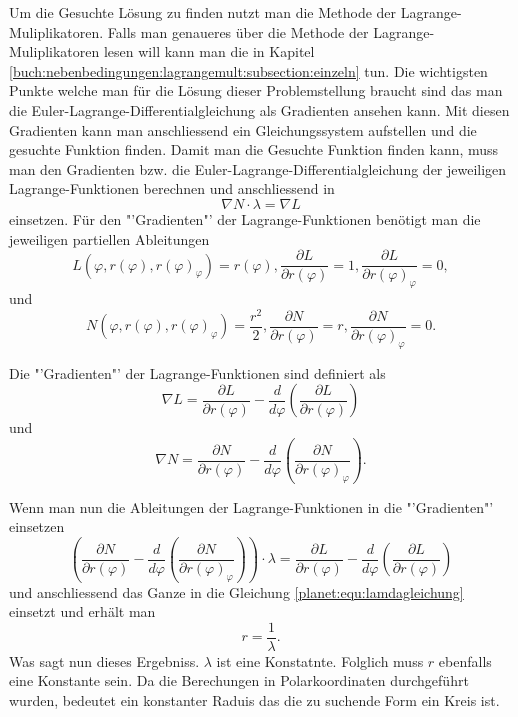 Um die Gesuchte Lösung zu finden nutzt man die Methode der Lagrange-Muliplikatoren.
Falls man genaueres über die Methode der Lagrange-Muliplikatoren lesen will kann man die in Kapitel \ref{buch:nebenbedingungen:lagrangemult:subsection:einzeln} tun.
Die wichtigsten Punkte welche man für die Lösung dieser Problemstellung braucht sind das man die Euler-Lagrange-Differentialgleichung als Gradienten ansehen kann.
Mit diesen Gradienten kann man anschliessend ein Gleichungssystem aufstellen und die gesuchte Funktion finden.
Damit man die Gesuchte Funktion finden kann, muss man den Gradienten bzw. die Euler-Lagrange-Differentialgleichung der jeweiligen Lagrange-Funktionen berechnen und anschliessend in
\begin{equation}
	\nabla N \cdot \lambda = \nabla L
	\label{planet:equ:lamdagleichung}
\end{equation}
einsetzen.
Für den "'Gradienten"' der Lagrange-Funktionen benötigt man die jeweiligen partiellen Ableitungen
\begin{equation*}
	L(\varphi ,r(\varphi),r(\varphi)_\varphi) = r(\varphi),
	\frac{\partial L}{\partial r(\varphi)} = 1,
	\frac{\partial L}{\partial r(\varphi)_\varphi} = 0,
\end{equation*}
und
\begin{equation*}
	N(\varphi ,r(\varphi),r(\varphi)_\varphi) = \frac{r^2}{2} ,
	\frac{\partial N}{\partial r(\varphi)} = r,
	\frac{\partial N}{\partial r(\varphi)_\varphi} = 0.
\end{equation*}

Die "'Gradienten"' der Lagrange-Funktionen sind definiert als 
\begin{equation*}
	\nabla L = 
	\frac{\partial L}{\partial r(\varphi)}-  \frac{d}{d\varphi}\left( \frac{\partial L}{\partial r(\varphi)} \right)
\end{equation*}
und
\begin{equation*}
	\nabla N = \frac{\partial N}{\partial r(\varphi)} - \frac{d}{d\varphi}\left(\frac{\partial N}{\partial r(\varphi)_\varphi}\right).
\end{equation*}

Wenn man nun die Ableitungen der Lagrange-Funktionen in die "'Gradienten"' einsetzen
\begin{equation*}
	\left(\frac{\partial N}{\partial r(\varphi)} - \frac{d}{d\varphi}\left(\frac{\partial N}{\partial r(\varphi)_\varphi}\right)\right)\cdot \lambda = \frac{\partial L}{\partial r(\varphi)}-  \frac{d}{d\varphi}\left( \frac{\partial L}{\partial r(\varphi)} \right)
\end{equation*} 
und anschliessend das Ganze in die Gleichung \eqref{planet:equ:lamdagleichung}
einsetzt und erhält man
\begin{equation*}
	r = \frac{1}{\lambda}.
\end{equation*}
Was sagt nun dieses Ergebniss.
\(\lambda\) ist eine Konstatnte.
Folglich muss \(r\) ebenfalls eine Konstante sein.
Da die Berechungen in Polarkoordinaten durchgeführt wurden, bedeutet ein konstanter Raduis das die zu suchende Form ein Kreis ist.

